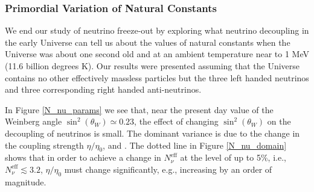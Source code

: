 \subsubsection{Primordial Variation of Natural Constants}
We end our study of neutrino freeze-out by exploring what neutrino decoupling in the early Universe can tell us about the values of natural constants when the Universe was about one second old and at an ambient temperature near to 1 MeV (11.6 billion degrees K). Our results were presented assuming that the Universe contains no other effectively massless particles but the three left handed neutrinos and  three corresponding right handed anti-neutrinos. 

In Figure \ref{N_nu_params} we see that, near  the present day value of the Weinberg angle  $\sin^2(\theta_W)\simeq 0.23$, the effect of changing $\sin^2(\theta_W)$ on the decoupling of neutrinos is small. The dominant variance is due to the change  in the coupling strength $\eta/\eta_0$,   and . The dotted line in  Figure \ref{N_nu_domain} shows that in order to achieve a change in $N_\nu^{\mathrm{eff}}$ at the level of up to 5\%, i.e., $N_\nu^{\mathrm{eff}}\lesssim 3.2 $,   $\eta/\eta_0$ must change significantly, e.g.,  increasing by an order of magnitude.

